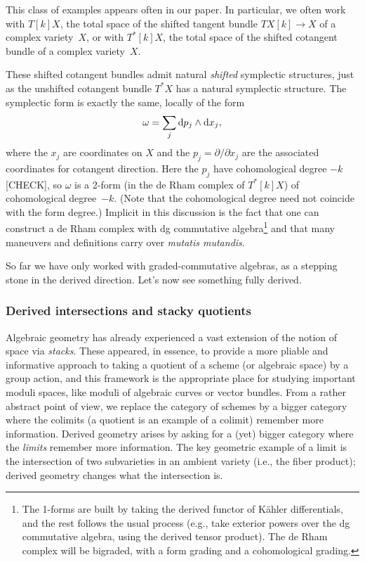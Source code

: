 \documentclass[11pt]{amsart}
\begin{document}
This class of examples appears often in our paper.
In particular, we often work with $T[k]X$, the total space of the shifted tangent bundle $TX[k] \to X$ of a complex variety~$X$,
or with $T^*[k]X$, the total space of the shifted cotangent bundle of a complex variety~$X$.

These shifted cotangent bundles admit natural {\em shifted} symplectic structures,
just as the unshifted cotangent bundle $T^*X$ has a natural symplectic structure.
The symplectic form is exactly the same, locally of the form
\[
\omega = \sum_j {\rm d} p_j \wedge {\rm d} x_j,
\]
where the $x_j$ are coordinates on $X$ and the $p_j = \partial/\partial x_j$ are the associated coordinates for cotangent direction.
Here the $p_j$ have cohomological degree $-k$ [CHECK], so $\omega$ is a 2-form (in the de Rham complex of $T^*[k]X$) of cohomological degree~$-k$.
(Note that the cohomological degree need not coincide with the form degree.)
Implicit in this discussion is the fact that one can construct a de Rham complex with dg commutative algebra\footnote{The 1-forms are built by taking the derived functor of K\"ahler differentials, and the rest follows the usual process (e.g., take exterior powers over the dg commutative algebra, using the derived tensor product). The de Rham complex will be bigraded, with a form grading and a cohomological grading.}
and that many maneuvers and definitions carry over {\it mutatis mutandis}.

So far we have only worked with graded-commutative algebras,
as a stepping stone in the derived direction.
Let's now see something fully derived.

\subsubsection{Derived intersections and stacky quotients}

Algebraic geometry has already experienced a vast extension of the notion of space via {\it stacks}.
These appeared, in essence, to provide a more pliable and informative approach to taking a quotient of a scheme (or algebraic space) by a group action,
and this framework is the appropriate place for studying important moduli spaces, like moduli of algebraic curves or vector bundles.
From a rather abstract point of view, we replace the category of schemes by a bigger category where the colimits (a quotient is an example of a colimit) remember more information.
Derived geometry arises by asking for a (yet) bigger category where the {\it limits} remember more information.
The key geometric example of a limit is the intersection of two subvarieties in an ambient variety (i.e., the fiber product);
derived geometry changes what the intersection is.
\end{document}
